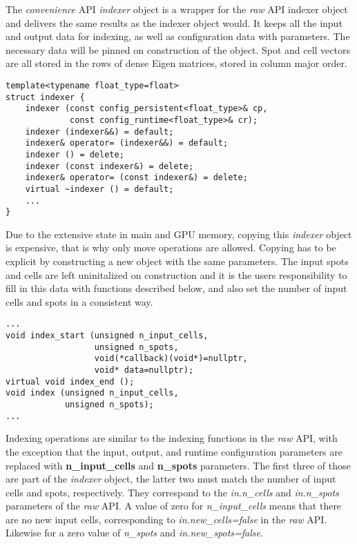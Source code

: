 \documentclass[a4paper,10pt]{article}
\begin{document}
The \emph{convenience} API \emph{indexer} object is a wrapper for the \emph{raw} API indexer object and delivers the same results as the indexer object would. It keeps all the input and output data for indexing, as well as configuration data with parameters. The necessary data will be pinned on construction of the object. Spot and cell vectors are all stored in the rows of dense Eigen matrices, stored in column major order.

\begin{lstlisting}
template<typename float_type=float>
struct indexer {
    indexer (const config_persistent<float_type>& cp,
             const config_runtime<float_type>& cr);
    indexer (indexer&&) = default;
    indexer& operator= (indexer&&) = default;
    indexer () = delete;
    indexer (const indexer&) = delete;
    indexer& operator= (const indexer&) = delete;
    virtual ~indexer () = default;
    ...
}
\end{lstlisting}

Due to the extensive state in main and GPU memory, copying this \emph{indexer} object is expensive, that is why only move operations are allowed. Copying has to be explicit by constructing a new object with the same parameters. The input spots and cells are left uninitalized on construction and it is the users responsibility to fill in this data with functions described below, and also set the number of input cells and spots in a consistent way.

\begin{lstlisting}
...
void index_start (unsigned n_input_cells,
                  unsigned n_spots,
                  void(*callback)(void*)=nullptr,
                  void* data=nullptr);
virtual void index_end ();
void index (unsigned n_input_cells,
            unsigned n_spots);
...
\end{lstlisting}

Indexing operations are similar to the indexing functions in the \emph{raw} API, with the exception that the input, output, and runtime configuration parameters are replaced with \textbf{n\_input\_cells} and \textbf{n\_spots} parameters. The first three of those are part of the \emph{indexer} object, the latter two must match the number of input cells and spots, respectively. They correspond to the \emph{in.n\_cells} and \emph{in.n\_spots} parameters of the \emph{raw} API. A value of zero for \emph{n\_input\_cells} means that there are no new input cells, corresponding to \emph{in.new\_cells=false} in the \emph{raw} API. Likewise for a zero value of \emph{n\_spots} and \emph{in.new\_spots=false}.
\end{document}

